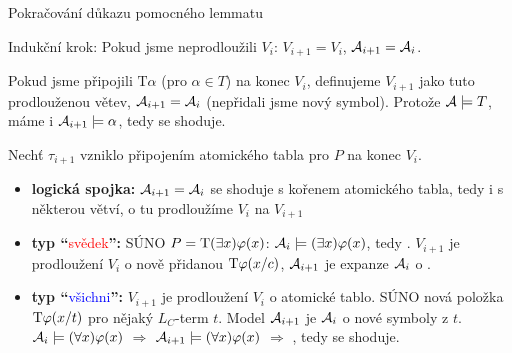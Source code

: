 \documentclass{beamer}
\begin{document}
\begin{frame}{Pokračování důkazu pomocného lemmatu}

    \vspace{-6pt}\pause
    \alert{Indukční krok:} Pokud jsme neprodloužili $V_i$: $V_{i+1}=V_i$, $\mathcal{A}_{i+1}=\mathcal{A}_i$.

    \vspace{-3pt}

    \pause
    Pokud jsme připojili $\mathrm{T}\alpha$ (pro $\alpha\in T$) na konec $V_i$, definujeme $V_{i+1}$ jako tuto prodlouženou větev, $\mathcal{A}_{i+1}=\mathcal{A}_i$ (nepřidali jsme nový symbol). Protože $\mathcal{A}\models T$, máme i $\mathcal{A}_{i+1}\models\alpha$, tedy se shoduje.
  
    \pause
    Nechť $\tau_{i+1}$ vzniklo připojením atomického tabla pro $P$ na konec $V_i$.

    \vspace{-3pt}
    
    \pause
    \begin{itemize}
        \item \textbf{logická spojka:} $\mathcal{A}_{i+1}=\mathcal{A}_i$ se shoduje s kořenem atomického tabla, tedy i s některou větví, o tu prodloužíme $V_i$ na $V_{i+1}$\pause
        
        \medskip

        \item \textbf{typ ``}\textcolor{red}{svědek}\textbf{'':} SÚNO $P=\mathrm{T}(\exists x)\varphi(x)$: $\mathcal{A}_i\models(\exists x)\varphi(x)$, tedy . $V_{i+1}$ je prodloužení $V_i$ o nově přidanou $\mathrm{T}\varphi(x/c)$, $\mathcal{A}_{i+1}$ je expanze $\mathcal{A}_i$ o .\pause
        
        \medskip

        \item \textbf{typ ``}\textcolor{blue}{všichni}\textbf{'':} $V_{i+1}$ je prodloužení $V_i$ o atomické tablo. SÚNO nová položka $\mathrm{T}\varphi(x/t)$ pro nějaký $L_C$-term $t$. \pause 
        Model $\mathcal{A}_{i+1}$ je  $\mathcal{A}_i$ o nové symboly z $t$.    
        $\mathcal{A}_i\models(\forall x)\varphi(x)$ $\Rightarrow$ $\mathcal{A}_{i+1}\models(\forall x)\varphi(x)$ $\Rightarrow$ , tedy se shoduje. \hfill\qedsymbol
    \end{itemize}

\end{frame}
\end{document}
